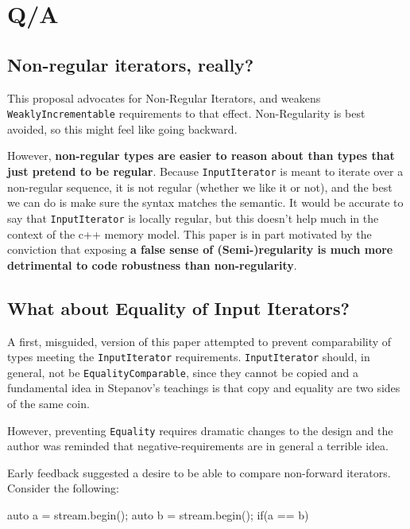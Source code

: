 \documentclass{wg21}
\begin{document}
\hypertarget{qa}{%
	\section{Q/A}\label{qa}}

\hypertarget{non-regular-iterators-really}{%
	\subsection{Non-regular iterators,
		really?}\label{non-regular-iterators-really}}

This proposal advocates for Non-Regular Iterators, and weakens
\texttt{WeaklyIncrementable} requirements to that effect. Non-Regularity
is best avoided, so this might feel like going backward.

However, \textbf{non-regular types are easier to reason about than types
	that just pretend to be regular}. Because \texttt{InputIterator} is
meant to iterate over a non-regular sequence, it is not regular (whether
we like it or not), and the best we can do is make sure the syntax
matches the semantic. It would be accurate to say that
\texttt{InputIterator} is locally regular, but this doesn't help much in
the context of the c++ memory model. This paper is in part motivated by
the conviction that exposing \textbf{a false sense of (Semi-)regularity
	is much more detrimental to code robustness than non-regularity}.

\hypertarget{what-about-equality-of-input-iterators}{%
	\subsection{What about Equality of Input
		Iterators?}\label{what-about-equality-of-input-iterators}}

A first, misguided, version of this paper attempted to prevent
comparability of types meeting the \texttt{InputIterator} requirements.
\texttt{InputIterator} should, in general, not be
\texttt{EqualityComparable}, since they cannot be copied and a
fundamental idea in Stepanov's teachings is that copy and equality are
two sides of the same coin.

However, preventing \texttt{Equality} requires dramatic changes to the
design and the author was reminded that negative-requirements are in
general a terrible idea.

Early feedback suggested a desire to be able to compare non-forward
iterators. Consider the following:

\begin{codeblock}
auto a = stream.begin(); 
auto b = stream.begin();
if(a == b) {
}
\end{codeblock}
\end{document}
